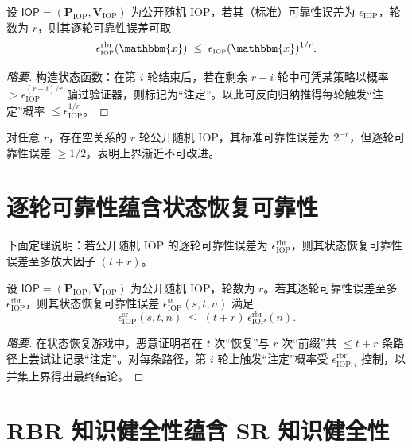 \documentclass[american,singlepageview]{snargs-book-zh}
\newcommand{\Instance}{\mathbbm{x}}
\newcommand{\ProtoProver}{P}
\newcommand{\ProtoVerifier}{V}
\newcommand{\ProtoSoundnessError}{\epsilon}
\newcommand{\RoundIndex}{i}
\newcommand{\SRSuperscript}{\mathrm{sr}}
\newcommand{\ProtoSRSoundnessError}{\ProtoSoundnessError^{\SRSuperscript}}
\newcommand{\ProtoRBRSoundnessError}{\ProtoSoundnessError^{\RBRSuperscript}}
\newcommand{\IOPSymbol}{\mathsf{IOP}}
\newcommand{\IOPSubscript}{\scriptscriptstyle\mathrm{IOP}}
\newcommand{\IOPFormat}[1]{\mathbf{#1}}
\newcommand{\IOPProver}{\IOPFormat{\ProtoProver}_{\IOPSubscript}}
\newcommand{\IOPVerifier}{\IOPFormat{\ProtoVerifier}_{\IOPSubscript}}
\newcommand{\IOPSystem}{(\IOPProver,\IOPVerifier)}
\newcommand{\IOPSoundnessError}{\ProtoSoundnessError_{\IOPSubscript}}
\newcommand{\SRBudget}{t}
\newcommand{\SRSaltSize}{s}
\newcommand{\IOPSRSoundnessError}{\ProtoSRSoundnessError_{\IOPSubscript}}
\newcommand{\RBRSuperscript}{\mathrm{rbr}}
\newcommand{\RBRSoundnessError}{\ProtoRBRSoundnessError_{\IOPSubscript}}
\newcommand{\RBRSoundnessErrorIdx}[1]{\ProtoRBRSoundnessError_{\IOPSubscript,#1}}
\begin{document}
\begin{claim}
\label{claim:soundness-to-rbr-soundness}
设 $\IOPSymbol=\IOPSystem$ 为公开随机 IOP，若其（标准）可靠性误差为 $\IOPSoundnessError$，轮数为 $r$，则其逐轮可靠性误差可取
\[
  \RBRSoundnessError(\Instance)\;\le\;\IOPSoundnessError(\Instance)^{1/r}.
\]
\end{claim}

\begin{proof}[略要]
构造状态函数：在第 $\RoundIndex$ 轮结束后，若在剩余 $r-\RoundIndex$ 轮中可凭某策略以概率 $>\IOPSoundnessError^{(r-\RoundIndex)/r}$ 骗过验证器，则标记为“注定”。以此可反向归纳推得每轮触发“注定”概率 $\le\IOPSoundnessError^{1/r}$。
\end{proof}

\begin{claim}
\label{claim:tightness-of-soundness-to-rbr-soundness}
对任意 $r$，存在空关系的 $r$ 轮公开随机 IOP，其标准可靠性误差为 $2^{-r}$，但逐轮可靠性误差 $\ge 1/2$，表明上界渐近不可改进。
\end{claim}

\section{逐轮可靠性蕴含状态恢复可靠性}
\label{section:rbr-soundness-to-sr-soundness}

下面定理说明：若公开随机 IOP 的逐轮可靠性误差为 $\RBRSoundnessError$，则其状态恢复可靠性误差至多放大因子 $(\SRBudget+r)$。

\begin{theorem}
\label{theorem:rbr-soundness-to-sr-soundness}
设 $\IOPSymbol=\IOPSystem$ 为公开随机 IOP，轮数为 $r$。若其逐轮可靠性误差至多 $\RBRSoundnessError$，则其状态恢复可靠性误差
$\IOPSRSoundnessError(\SRSaltSize,\SRBudget,n)$ 满足
\[
  \IOPSRSoundnessError(\SRSaltSize,\SRBudget,n)
  \;\le\;
  (\SRBudget+r)\,\RBRSoundnessError(n).
\]
\end{theorem}

\begin{proof}[略要]
在状态恢复游戏中，恶意证明者在 $\SRBudget$ 次“恢复”与 $r$ 次“前缀”共 ${\le}\SRBudget+r$ 条路径上尝试让记录“注定”。对每条路径，第 $\RoundIndex$ 轮上触发“注定”概率受 $\RBRSoundnessErrorIdx{\RoundIndex}$ 控制，以并集上界得出最终结论。
\end{proof}

\section{RBR 知识健全性蕴含 SR 知识健全性}
\label{section:rbr-knowledge-soundness-to-sr-knowledge-soundness}
\end{document}
